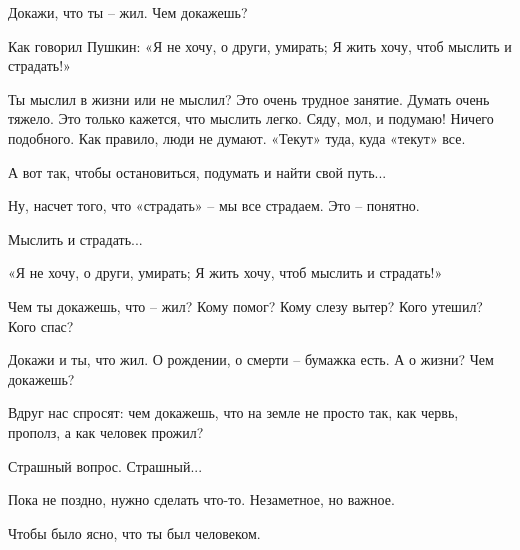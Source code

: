 Докажи, что ты – жил. Чем докажешь? 

Как говорил Пушкин: «Я не хочу, о други, умирать; Я жить хочу, чтоб мыслить и
страдать!»

Ты мыслил в жизни или не мыслил? Это очень трудное занятие. Думать очень
тяжело. Это только кажется, что мыслить легко. Сяду, мол, и подумаю! Ничего
подобного. Как правило, люди не думают. «Текут» туда, куда «текут» все. 

А вот так, чтобы остановиться, подумать и найти свой путь...

Ну, насчет того, что «страдать» – мы все страдаем. Это – понятно. 

Мыслить и страдать... 

«Я не хочу, о други, умирать; Я жить хочу, чтоб мыслить и страдать!»

Чем ты докажешь, что – жил? Кому помог? Кому слезу вытер? Кого утешил? Кого
спас?

Докажи и ты, что жил. О рождении, о смерти – бумажка есть. А о жизни? Чем
докажешь?

Вдруг нас спросят: чем докажешь, что на земле не просто так, как червь,
прополз, а как человек прожил? 

Страшный вопрос. Страшный... 

Пока не поздно, нужно сделать что-то. Незаметное, но важное. 

Чтобы было ясно, что ты был человеком.
